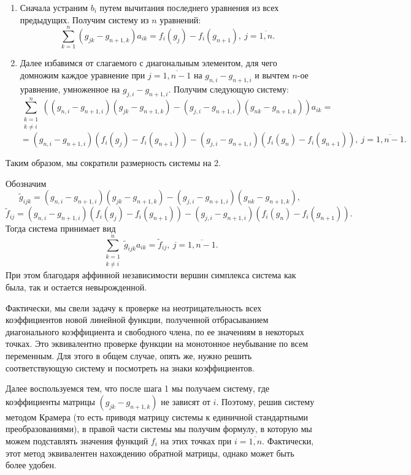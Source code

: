 \documentclass{article}
\theoremstyle{definition}
\begin{document}
\begin{enumerate}
	
\item Сначала устраним \(b_i\) путем вычитания последнего уравнения из всех предыдущих. Получим систему из \(n\) уравнений:
\[
	\sum_{k = 1}^{n}(g_{jk} - g_{n+1,k})a_{ik} = f_i(g_j) - f_i(g_{n+1}),\ j = \overline{1, n}.
\]
\item Далее избавимся от слагаемого с диагональным элементом, для чего домножим каждое уравнение при \(j = \overline{1, n-1}\) на \(g_{n,i} - g_{n+1,i}\) и вычтем \(n\)-ое уравнение, умноженное на \(g_{j, i} - g_{n+1,i}\). Получим следующую систему:
\[
	\sum_{\substack{k = 1 \\ k \neq i}}^{n}\left((g_{n,i} - g_{n+1,i})(g_{jk} - g_{n+1,k}) - (g_{j, i} - g_{n+1,i})(g_{nk} - g_{n+1,k})\right)a_{ik} = 
\]
\[
	= (g_{n,i} - g_{n+1,i})(f_i(g_j) - f_i(g_{n+1})) - (g_{j, i} - g_{n+1,i})(f_i(g_n) - f_i(g_{n+1})),\ j = \overline{1, n-1}.
\]
\end{enumerate}
Таким образом, мы сократили размерность системы на 2. 

Обозначим 
\[\tilde g_{ijk} = (g_{n,i} - g_{n+1,i})(g_{jk} - g_{n+1,k}) - (g_{j, i} - g_{n+1,i})(g_{nk} - g_{n+1,k}),\]
\[\tilde f_{ij} = (g_{n,i} - g_{n+1,i})(f_i(g_j) - f_i(g_{n+1})) - (g_{j, i} - g_{n+1,i})(f_i(g_n) - f_i(g_{n+1})).\]
Тогда система принимает вид
\[
	\sum_{\substack{k = 1 \\ k \neq i}}^{n}\tilde g_{ijk}a_{ik} = \tilde f_{ij},\ j = \overline{1, n-1}.
\]
При этом благодаря аффинной независимости вершин симплекса система как была, так и остается невырожденной.

Фактически, мы свели задачу к проверке на неотрицательность всех коэффициентов новой линейной функции, полученной отбрасыванием диагонального коэффициента и свободного члена, по ее значениям в некоторых точках. Это эквивалентно проверке функции на монотонное неубывание по всем переменным. Для этого в общем случае, опять же, нужно решить соответствующую систему и посмотреть на знаки коэффициентов. 

Далее воспользуемся тем, что после шага 1 мы получаем систему, где коэффициенты матрицы \((g_{jk} - g_{n+1,k})\) не зависят от \(i\). Поэтому, решив систему методом Крамера (то есть приводя матрицу системы к единичной стандартными преобразованиями), в правой части системы мы получим формулу, в которую мы можем подставлять значения функций \(f_i\) на этих точках при \(i = \overline{1, n}\). Фактически, этот метод эквивалентен нахождению обратной матрицы, однако может быть более удобен.
\end{document}
